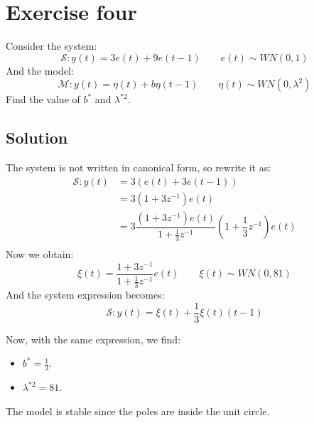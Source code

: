\section{Exercise four}

Consider the system: 
\[\mathcal{S}:y(t)=3e(t)+9e(t-1)\qquad e(t)\sim WN(0,1)\]
And the model: 
\[\mathcal{M}:y(t)=\eta(t)+b\eta(t-1)\qquad \eta(t)\sim WN(0,\lambda^2)\]
Find the value of $b^\ast$ and $\lambda^{\ast 2}$. 

\subsection*{Solution}
The system is not written in canonical form, so rewrite it as:
\begin{align*}
    \mathcal{S}:y(t)    &=3\left(e(t)+3e(t-1)\right) \\
                        &=3\left(1+3z^{-1}\right)e(t) \\
                        &=3\dfrac{\left(1+3z^{-1}\right)e(t)}{1+\frac{1}{3}z^{-1}}\left(1+\dfrac{1}{3}z^{-1}\right)e(t) \\           
\end{align*}
Now we obtain:
\[\xi(t)=\dfrac{1+3z^{-1}}{1+\frac{1}{3}z^{-1}}e(t)\qquad \xi(t)\sim WN(0,81)\]
And the system expression becomes:
\[\mathcal{S}:y(t)=\xi(t)+\dfrac{1}{3}\xi(t)(t-1)\]

Now, with the same expression, we find:
\begin{itemize}
    \item $b^\ast=\frac{1}{3}$.
    \item $\lambda^{\ast 2}=81$.
\end{itemize}
The model is stable since the poles are inside the unit circle.